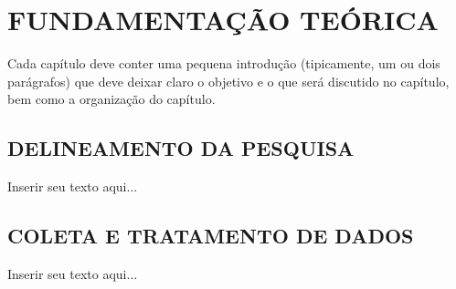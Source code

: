 
\chapter{FUNDAMENTAÇÃO TEÓRICA}
\label{chap:metodologia}
Cada capítulo deve conter uma pequena introdução (tipicamente, um ou dois parágrafos) que deve deixar claro o objetivo e o que será discutido no capítulo, bem como a organização do capítulo.

\section{DELINEAMENTO DA PESQUISA}
\label{sec:titSecDelPesq}

Inserir seu texto aqui...

\section{COLETA E TRATAMENTO DE DADOS}
\label{sec:titSecColDad}

Inserir seu texto aqui...
